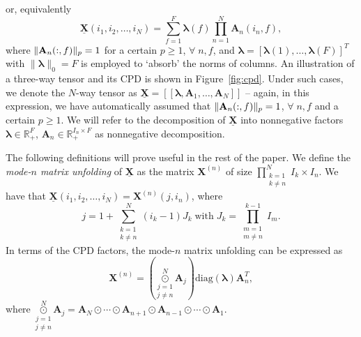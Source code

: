 \documentclass[journal]{IEEEtran}
\newcommand{\blue}[1]{\textcolor{blue}{#1}}
\begin{document}
or, equivalently
\begin{equation}
\underline{\mathbf{X}}(i_1,i_2,\ldots,i_N) = \sum_{f=1}^F \boldsymbol{\lambda}(f)  \prod_{n=1}^N \mathbf{A}_n(i_n,f),
\label{eq:individ}
\end{equation}
where $\|{\bf A}_n(:,f)\|_p=1$ for {a certain} $p\geq 1$,  $\forall \;  n,f$, and ${\bm \lambda}=[{\bm \lambda}(1),\ldots,{\bm \lambda}(F)]^T$ with $\|{\bm \lambda}\|_0=F$ is employed to `absorb' the norms of columns. An illustration of a {three-way} tensor and its CPD is shown in Figure~\ref{fig:cpd}. Under such cases, we denote the $N$-way tensor as  $\underline{\mathbf{X}} = [\![ {\bm \lambda}, \mathbf{A}_1,\ldots,\mathbf{A}_N ]\!]$ -- again, in this expression, we have automatically assumed that $\|{\bf A}_n(:,f)\|_p=1$, $\forall \; n,f$ and a certain $p\geq1$. {We will refer to the decomposition of $\underline{\mathbf{X}}$ into nonnegative factors $\boldsymbol{\lambda} \in \mathbb{R}_+^F$, $\mathbf{A}_n \in \mathbb{R}_+^{I_n \times F}$ as nonnegative decomposition.}




The following definitions will prove useful in the rest of the paper. We define the \emph{mode-$n$ matrix unfolding} of $\underline{\mathbf{X}}$ as the matrix ${\mathbf{X}}^{(n)}$ of size $\prod_{ \substack{k=1 \\ k\neq n}}^N I_k \times I_n$. We have that $\underline{\mathbf{X}}(i_1,i_2,\ldots,i_N) = {\mathbf{X}}^{(n)}(j,i_n)$, where
\begin{equation*}
j = 1 + \sum_{ \substack{k=1 \\ k \neq n} }^N (i_k-1) J_k \; \text{with} \; J_k = \prod_{  \substack{m=1 \\ m \neq n}}^{k-1} I_m.
\end{equation*}
In terms of the CPD factors, the mode-$n$ matrix unfolding can be expressed as
\begin{equation}
{\mathbf{X}}^{(n)} =  \left( \underset{j\neq n}{ \underset{j=1}{ \overset{N}{\odot}}} \mathbf{A}_j \right) \textrm{diag}(\boldsymbol{\lambda}) \mathbf{A}_n^T,
\end{equation}
where
$\underset{j\neq n}{ \underset{j=1}{ \overset{N}{\odot}}} \mathbf{A}_j = \mathbf{A}_N \odot \cdots \odot \mathbf{A}_{n+1} \odot \mathbf{A}_{n-1} \odot \cdots \odot \mathbf{A}_1.$
\end{document}
